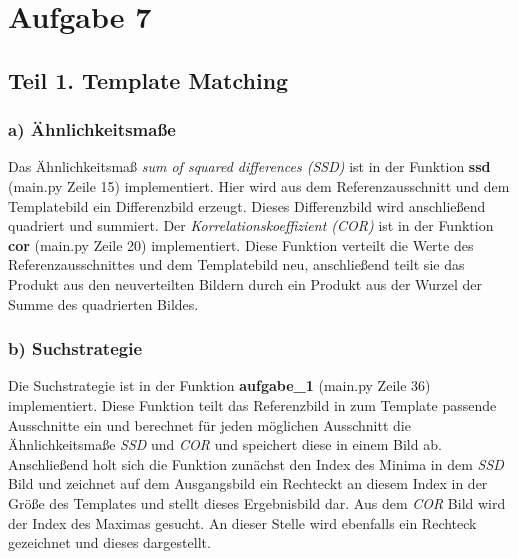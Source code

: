 \documentclass[12pt]{article}
\begin{document}

\section*{Aufgabe 7}
\subsection*{Teil 1. Template Matching}
\subsubsection*{a) Ähnlichkeitsmaße}
Das Ähnlichkeitsmaß \textit{sum of squared differences (SSD)} ist in der Funktion \textbf{ssd} (main.py Zeile 15) implementiert. Hier wird aus dem Referenzausschnitt und dem Templatebild ein Differenzbild erzeugt. Dieses Differenzbild wird anschließend quadriert und summiert.
Der \textit{Korrelationskoeffizient (COR)} ist in der Funktion \textbf{cor} (main.py Zeile 20) implementiert. Diese Funktion verteilt die Werte des Referenzausschnittes und dem Templatebild neu, anschließend teilt sie das Produkt aus den neuverteilten Bildern durch ein Produkt aus der Wurzel der Summe des quadrierten Bildes.

\subsubsection*{b) Suchstrategie}
Die Suchstrategie ist in der Funktion \textbf{aufgabe\_1} (main.py Zeile 36) implementiert. Diese Funktion teilt das Referenzbild in zum Template passende Ausschnitte ein und berechnet für jeden möglichen Ausschnitt die Ähnlichkeitsmaße \textit{SSD} und \textit{COR} und speichert diese in einem Bild ab.
Anschließend holt sich die Funktion zunächst den Index des Minima in dem \textit{SSD} Bild und zeichnet auf dem Ausgangsbild ein Rechteckt an diesem Index in der Größe des Templates und stellt dieses Ergebnisbild dar.
Aus dem \textit{COR} Bild wird der Index des Maximas gesucht. An dieser Stelle wird ebenfalls ein Rechteck gezeichnet und dieses dargestellt.

\newpage
\end{document}
